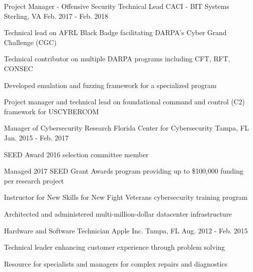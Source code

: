 \begin{cventries}
\vspace{1em}

    \cventry
      {Project Manager - Offensive Security Technical Lead} %
      {CACI - BIT Systems} %
      {Sterling, VA} %
      {Feb. 2017 - Feb. 2018} %
      {
        \begin{cvitems} %
          \item {Technical lead on AFRL Black Badge facilitating DARPA's Cyber Grand Challenge (CGC)}
          \item {Technical contributor on multiple DARPA programs including CFT, RFT, CONSEC}
          \item {Developed emulation and fuzzing framework for a specialized program}
          \item {Project manager and technical lead on foundational command and control (C2) framework for USCYBERCOM}
        \end{cvitems}
      }

\vspace{1em}
    \cventry
      {Manager of Cybersecurity Research} %
      {Florida Center for Cybersecurity} %
      {Tampa, FL} %
      {Jan. 2015 - Feb. 2017} %
      {
        \begin{cvitems} %
          \item {SEED Award 2016 selection committee member}
          \item {Managed 2017 SEED Grant Awards program providing up to \$100,000 funding per research project}
          \item {Instructor for New Skills for New Fight Veterans cybersecurity training program}
          \item {Architected and administered multi-million-dollar datacenter infrastructure}
        \end{cvitems}
      }

\vspace{1em}
    \cventry
      {Hardware and Software Technician} %
      {Apple Inc.} %
      {Tampa, FL} %
      {Aug. 2012 - Feb. 2015} %
      {
        \begin{cvitems} %
          \item {Technical leader enhancing customer experience through problem solving}
          \item {Resource for specialists and managers for complex repairs and diagnostics}
        \end{cvitems}
      }

\end{cventries}
